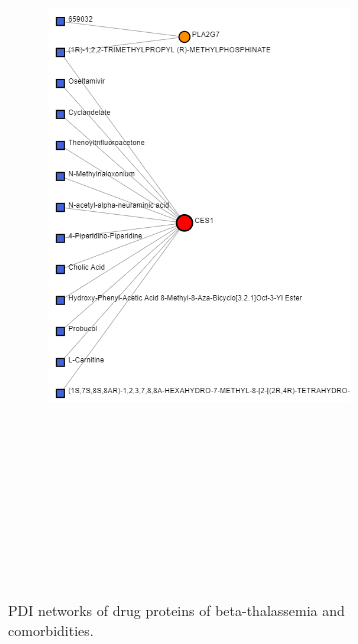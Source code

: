\begin{figure}[H]
\begin{subfigure}[t]{0.48\textwidth}
        \includegraphics[height=20cm, width=8cm]{./fig/fig4_14_2.png}
        \label{fig:subnetwork2}
    \end{subfigure}
    \caption{PDI networks of drug proteins of beta-thalassemia and comorbidities.}
    \label{fig:figure4-14}
\end{figure}